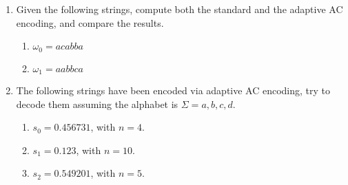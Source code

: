 \documentclass{subfiles}
\begin{document}
    \begin{exercises*}
        \begin{enumerate}
            \item Given the following strings, compute both the standard and 
                the adaptive AC encoding, and compare the results.
                \begin{enumerate}
                    \item \(\omega_{0} = acabba\)
                    \item \(\omega_{1} = aabbca\)
                \end{enumerate}       

            \item The following strings have been encoded via adaptive AC encoding,
                try to decode them assuming the alphabet is \(\Sigma = {a, b, c, d}\).
                \begin{enumerate}
                    \item \(s_{0} = 0.456731\), with \(n = 4\).
                    \item \(s_{1} = 0.123\), with \(n = 10\).
                    \item \(s_{2} = 0.549201\), with \(n = 5\).
                \end{enumerate}
        \end{enumerate}
    \end{exercises*}
    \cleardoublepage
\end{document}
